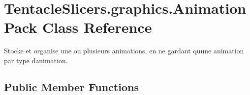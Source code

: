 \hypertarget{class_tentacle_slicers_1_1graphics_1_1_animation_pack}{}\section{Tentacle\+Slicers.\+graphics.\+Animation\+Pack Class Reference}
\label{class_tentacle_slicers_1_1graphics_1_1_animation_pack}


Stocke et organise une ou plusieurs animations, en ne gardant qu\textquotesingle{}une animation par type d\textquotesingle{}animation.  


\subsection*{Public Member Functions}
